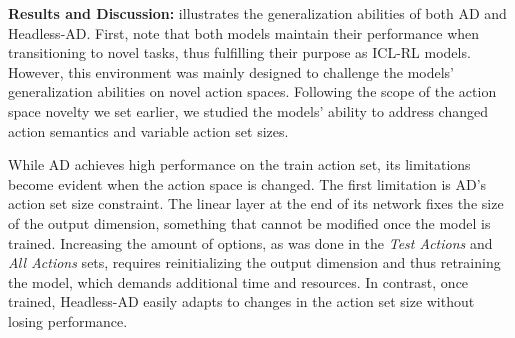 \textbf{Results and Discussion:}  illustrates the generalization abilities of both AD and Headless-AD. First, note that both models maintain their performance when transitioning to novel tasks, thus fulfilling their purpose as ICL-RL models. However, this environment was mainly designed to challenge the models' generalization abilities on novel action spaces. Following the scope of the action space novelty we set earlier, we studied the models' ability to address changed action semantics and variable action set sizes. 

While AD achieves high performance on the train action set, its limitations become evident when the action space is changed. The first limitation is AD's action set size constraint. The linear layer at the end of its network fixes the size of the output dimension, something that cannot be modified once the model is trained. Increasing the amount of options, as was done in the \textit{Test Actions} and \textit{All Actions} sets, requires reinitializing the output dimension and thus retraining the model, which demands additional time and resources. In contrast, once trained, Headless-AD easily adapts to changes in the action set size without losing performance. 

